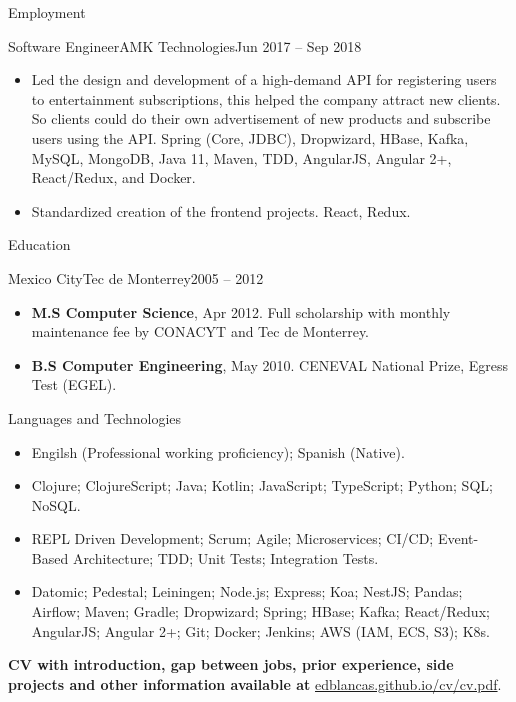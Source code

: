 \documentclass[calibri]{../macdowell-cv/mcdowellcv}
\begin{document}
\begin{cvsection}{Employment}
		\begin{cvsubsection}{Software Engineer}{AMK Technologies}{Jun 2017 -- Sep 2018}
			\begin{itemize}
				\item Led the design and development of a high-demand API for registering users to entertainment subscriptions, this helped the company attract new clients. So clients could do their own advertisement of new products and subscribe users using the API. Spring (Core, JDBC), Dropwizard, HBase, Kafka, MySQL, MongoDB, Java 11, Maven, TDD, AngularJS, Angular 2+, React/Redux, and Docker.
				\item Standardized creation of the frontend projects. React, Redux.
			\end{itemize}
		\end{cvsubsection}
	\end{cvsection}
	
	\begin{cvsection}{Education}
		\begin{cvsubsection}{Mexico City}{Tec de Monterrey}{2005 -- 2012}
			\begin{itemize}
				\item \textbf{M.S Computer Science}, Apr 2012. Full scholarship with monthly maintenance fee by CONACYT and Tec de Monterrey.
				\item \textbf{B.S Computer Engineering}, May 2010. CENEVAL National Prize, Egress Test (EGEL).
			\end{itemize}
		\end{cvsubsection}
	\end{cvsection}
	
	\begin{cvsection}{Languages and Technologies}
		\begin{cvsubsection}{}{}{}	
			\begin{itemize}
				\item Engilsh (Professional working proficiency); Spanish (Native).
				\item Clojure; ClojureScript; Java; Kotlin; JavaScript; TypeScript; Python; SQL; NoSQL.
				\item REPL Driven Development; Scrum; Agile; Microservices; CI/CD; Event-Based Architecture; TDD; Unit Tests; Integration Tests.
				\item Datomic; Pedestal; Leiningen; Node.js; Express; Koa; NestJS; Pandas; Airflow; Maven; Gradle; Dropwizard; Spring; HBase; Kafka; React/Redux; AngularJS; Angular 2+; Git; Docker; Jenkins; AWS (IAM, ECS, S3); K8s.
			\end{itemize}
		\end{cvsubsection}
	\end{cvsection}

	\begin{flushleft}
		\textbf{CV with introduction, gap between jobs, prior experience, side
        projects and other information available at} \href{https://edblancas.github.io/cv/cv.pdf}{edblancas.github.io/cv/cv.pdf}.
	\end{flushleft}
	
\end{document}
